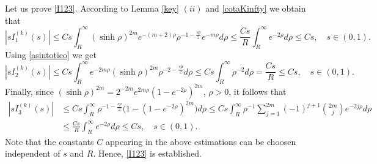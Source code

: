 \documentclass[a4paper,10pt, reqno]{amsart}
\theoremstyle{definition}
\theoremstyle{remark}
\numberwithin{equation}{section}
\begin{document}
{Let us prove \eqref{I123}. According to Lemma \ref{key} $(ii)$ and \eqref{cotaKinfty} we obtain that
\begin{equation}\label{sI1k}
    |sI_1^{(k)}(s)|\leq Cs\int_R^\infty (\sinh \rho )^{2m}e^{-(m+2)\rho }\rho ^{-1-\frac{sp}{2}}e^{-m\rho}d\rho\leq \frac{Cs}{R}\int_R^\infty e^{-2\rho}d\rho\leq Cs,\quad  s\in (0,1).
\end{equation}
Using \eqref{asintotico} we get
\begin{equation}\label{sI2k}
|sI_2^{(k)}(s)|\leq Cs\int_R^\infty e^{-2m\rho }(\sinh \rho )^{2m}\rho ^{-2-\frac{sp}{2}}d\rho \leq Cs\int_R^\infty \rho ^{-2}d\rho =\frac{Cs}{R}\leq Cs, \quad s\in (0,1).
\end{equation}
Finally, since $(\sinh \rho )^{2m}=2^{-2m}e^{2m\rho}(1-e^{-2\rho })^{2m}$, $\rho >0$, it follows that
\begin{align}\label{sI3k}
|sI_3^{(k)}(s)|&\leq Cs\int_R^\infty \rho ^{-1-\frac{sp}{2}}\big(1-(1-e^{-2\rho })^{2m}\big)d\rho \leq Cs\int_R^\infty \rho ^{-1}\sum_{j=1}^{2m}(-1)^{j+1}\binom{2m}{j}e^{-2j\rho }d\rho\nonumber\\
&\leq \frac{Cs}{R}\int_R^\infty e^{-2\rho }d\rho\leq Cs,\quad s\in (0,1).
\end{align}
Note that the constants $C$ appearing in the above estimations can be choosen independent of $s$ and $R$. Hence, \eqref{I123} is established.

}
\end{document}
